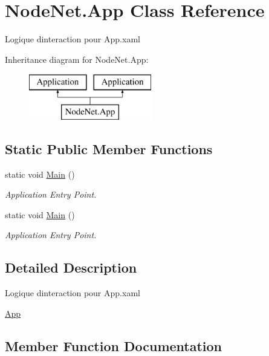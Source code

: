 \hypertarget{class_node_net_1_1_app}{}\section{Node\+Net.\+App Class Reference}
\label{class_node_net_1_1_app}


Logique d\textquotesingle{}interaction pour App.\+xaml  


Inheritance diagram for Node\+Net.\+App\+:\begin{figure}[H]
\begin{center}
\leavevmode
\includegraphics[height=2.000000cm]{class_node_net_1_1_app}
\end{center}
\end{figure}
\subsection*{Static Public Member Functions}
\begin{DoxyCompactItemize}
\item 
static void \hyperlink{class_node_net_1_1_app_a7528fd13a6e2fede888355eeeb5d61ba}{Main} ()
\begin{DoxyCompactList}\small\item\em Application Entry Point. \end{DoxyCompactList}\item 
static void \hyperlink{class_node_net_1_1_app_a7528fd13a6e2fede888355eeeb5d61ba}{Main} ()
\begin{DoxyCompactList}\small\item\em Application Entry Point. \end{DoxyCompactList}\end{DoxyCompactItemize}


\subsection{Detailed Description}
Logique d\textquotesingle{}interaction pour App.\+xaml 

\hyperlink{class_node_net_1_1_app}{App} 

\subsection{Member Function Documentation}
\mbox{\label{class_node_net_1_1_app_a7528fd13a6e2fede888355eeeb5d61ba}} 
